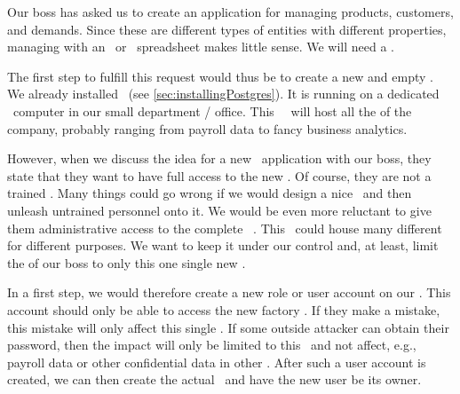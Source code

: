 %
%
\label{sec:simpleExample:createUser}%
%
Our boss has asked us to create an application for managing products, customers, and demands.
Since these are different types of entities with different properties, managing with an \microsoftExcel\ or \libreofficeCalc\ spreadsheet makes little sense.
We will need a \db.

The first step to fulfill this request would thus be to create a new and empty \db.
We already installed \postgresql~(see \cref{sec:installingPostgres}).
It is running on a dedicated \server\ computer in our small  department / office.
This \db\ \server\ will host all the  of the company, probably ranging from payroll data to fancy business analytics.

However, when we discuss the idea for a new \db\ application with our boss, they state that they want to have full access to the new \db.
Of course, they are not a trained .
Many things could go wrong if we would design a nice \db\ and then unleash untrained personnel onto it.
We would be even more reluctant to give them administrative access to the complete \dbms\ \server.
This \server\ could house many different  for different purposes.
We want to keep it under our control and, at least, limit the  of our boss to only this one single new \db.

In a first step, we would therefore create a new role or user account on our \dbms.
This account should only be able to access the new factory \db.
If they make a mistake, this mistake will only affect this single \db.
If some outside attacker can obtain their password, then the impact will only be limited to this \db\ and not affect, e.g., payroll data or other confidential data in other .
After such a user account is created, we can then create the actual \db\ and have the new user be its owner.%
%
%
%
%
\FloatBarrier%
\endhsection%
%
